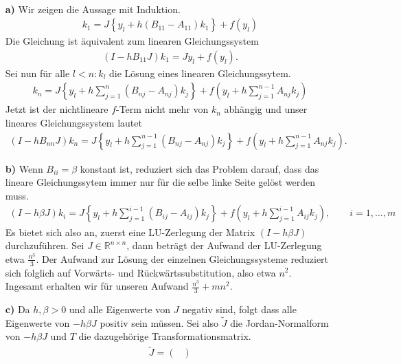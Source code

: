 \begin{solution}
\leavevmode \\
\begin{itemize}
  \item [\textbf{a)}] Wir zeigen die Aussage mit Induktion.
  \begin{align*}
    k_1 = J\left\{y_l + h(B_{11}-A_{11})k_1\right\} + f(y_l)
  \end{align*}
  Die Gleichung ist äquivalent zum linearen Gleichungssystem
  \begin{align*}
    (I - hB_{11}J)k_1 = Jy_l + f(y_l).
  \end{align*}
  Sei nun für alle $l < n: k_l$ die Lösung eines linearen Gleichungssytem.
  \begin{align*}
    k_n = J\left\{y_l + h\sum_{j=1}^n(B_{nj}-A_{nj})k_j\right\} + f(y_l +h\sum_{j=1}^{n-1}A_{nj}k_j)
  \end{align*}
  Jetzt ist der nichtlineare $f$-Term nicht mehr von $k_n$ abhängig und unser lineares Gleichungssystem lautet
  \begin{align*}
    (I - hB_{nn}J)k_n = J\left\{y_l + h\sum_{j=1}^{n-1}(B_{nj}-A_{nj})k_j\right\} + f(y_l +h\sum_{j=1}^{n-1}A_{nj}k_j).
  \end{align*}
  \item [\textbf{b)}] Wenn $B_{ii} = \beta$ konstant ist, reduziert sich das Problem
  darauf, dass das lineare Gleichungssytem immer nur für die selbe linke Seite gelöst werden muss.
  \begin{align*}
    (I - h\beta J)k_i = J\left\{y_l + h\sum_{j=1}^{i-1}(B_{ij}-A_{ij})k_j\right\} + f(y_l +h\sum_{j=1}^{i-1}A_{ij}k_j), \qquad i = 1,\dots,m
  \end{align*}
  Es bietet sich also an, zuerst eine LU-Zerlegung der Matrix $(I - h\beta J)$ durchzuführen.
  Sei $J \in \mathbb{R}^{n \times n}$, dann beträgt der Aufwand der LU-Zerlegung etwa $\frac{n^3}{3}$.
  Der Aufwand zur Lösung der einzelnen Gleichungssysteme reduziert sich folglich
  auf Vorwärts- und Rückwärtssubstitution, also etwa $n^2$. \\
  Ingesamt erhalten wir für unseren Aufwand $\frac{n^3}{3} + mn^2$.
  \item [\textbf{c)}] Da $h, \beta > 0$ und alle Eigenwerte von $J$ negativ sind, folgt
  dass alle Eigenwerte von $-h\beta J$ positiv sein müssen.
  Sei also $\widetilde{J}$ die Jordan-Normalform von $-h\beta J$ und $T$ die
  dazugehörige Transformationsmatrix.
  \begin{align*}
  \widetilde{J} =
    \begin{pmatrix}

\end{pmatrix}
\end{align*}
\end{itemize}
\end{solution}
